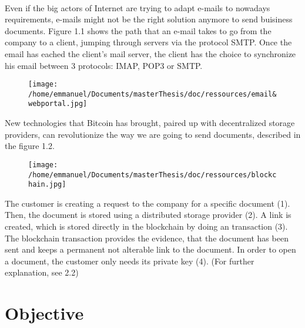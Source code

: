 \paragraph{}
 Even if the big actors of Internet are trying to adapt e-mails to nowadays requirements, e-mails might not be the right solution anymore to send buisiness documents. Figure 1.1 shows the path that an e-mail takes to go from the company to a client, jumping through servers via the protocol SMTP. Once the email has eached the client's mail server, the client has the choice to synchronize his email between 3 protocols: IMAP, POP3 or SMTP.
\begin{figure}[htp]
\centering
\texttt{[image: /home/emmanuel/Documents/masterThesis/doc/ressources/email\&webportal.jpg]}
\caption{}
\label{}
\end{figure}
\newline
New technologies that Bitcoin has brought, paired up with decentralized storage providers, can revolutionize the way we are going to send documents, described in the figure 1.2. 
\begin{figure}[htp]
\centering
\texttt{[image: /home/emmanuel/Documents/masterThesis/doc/ressources/blockchain.jpg]}
\caption{}
\label{}
\end{figure}
\newline
The customer is creating a request to the company for a specific document (1). Then, the document is stored using a distributed storage provider (2). A link is created, which is stored directly in the blockchain by doing an transaction (3). The blockchain transaction provides the evidence, that the document has been sent and keeps a permanent not alterable link to the document. In order to open a document, the customer only needs its private key (4). (For further explanation, see 2.2)

\section{Objective}
